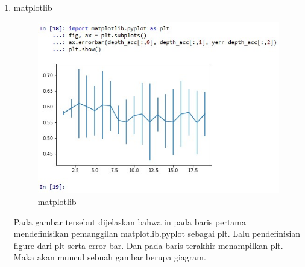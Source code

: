 \begin{enumerate}
\item matplotlib
\begin{figure}
\centering
\includegraphics[scale=0.5]{figures/g12.jpg}
\caption{matplotlib}
\label{contoh}
\end{figure}
\par Pada gambar tersebut dijelaskan bahwa in pada baris pertama mendefinisikan pemanggilan  matplotlib.pyplot sebagai plt. Lalu pendefinisian figure dari plt serta error bar. Dan pada baris terakhir menampilkan plt. Maka akan muncul sebuah gambar berupa giagram.

\end{enumerate}

